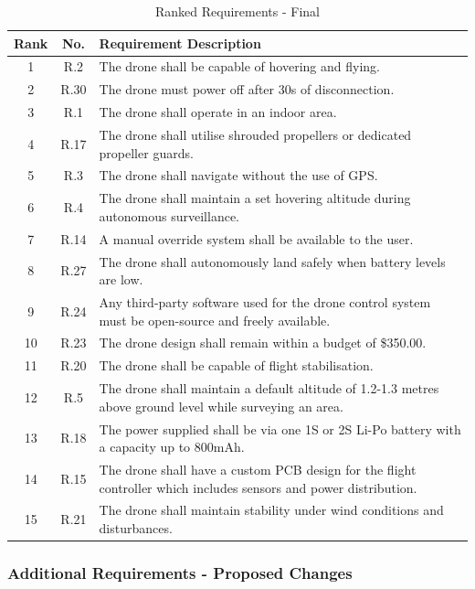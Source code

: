 \begin{table}[H]
\centering
\caption{Ranked Requirements - Final}
\begin{tabular}{|c|c|p{11cm}|}
\hline
\textbf{Rank} & \textbf{No.} & \textbf{Requirement Description} \\ \hline
1 & R.2 & The drone shall be capable of hovering and flying. \\ \hline
2 & R.30 & The drone must power off after 30s of disconnection. \\ \hline
3 & R.1 & The drone shall operate in an indoor area. \\ \hline
4 & R.17 & The drone shall utilise shrouded propellers or dedicated propeller guards. \\ \hline
5 & R.3 & The drone shall navigate without the use of GPS. \\ \hline
6 & R.4 & The drone shall maintain a set hovering altitude during autonomous surveillance. \\ \hline
7 & R.14 & A manual override system shall be available to the user. \\ \hline
8 & R.27 & The drone shall autonomously land safely when battery levels are low. \\ \hline
9 & R.24 & Any third-party software used for the drone control system must be open-source and freely available. \\ \hline
10 & R.23 & The drone design shall remain within a budget of \$350.00. \\ \hline
11 & R.20 & The drone shall be capable of flight stabilisation. \\ \hline
12 & R.5 & The drone shall maintain a default altitude of 1.2-1.3 metres above ground level while surveying an area. \\ \hline
13 & R.18 & The power supplied shall be via one 1S or 2S Li-Po battery with a capacity up to 800mAh. \\ \hline
14 & R.15 & The drone shall have a custom PCB design for the flight controller which includes sensors and power distribution. \\ \hline
15 & R.21 & The drone shall maintain stability under wind conditions and disturbances. \\ \hline
\end{tabular}
\end{table}

\subsubsection{Additional Requirements - Proposed Changes}

